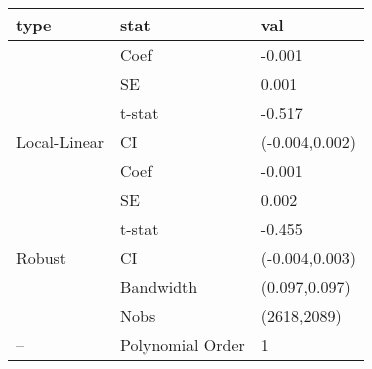 
\begin{tabular}{lll}
\toprule
type & stat & val\\
\midrule
 & Coef & -0.001\\

 & SE & 0.001\\

 & t-stat & -0.517\\

\multirow{-4}{*}{\raggedright\arraybackslash Local-Linear} & CI & (-0.004,0.002)\\
\cmidrule{1-3}
 & Coef & -0.001\\

 & SE & 0.002\\

 & t-stat & -0.455\\

\multirow{-4}{*}{\raggedright\arraybackslash Robust} & CI & (-0.004,0.003)\\
\cmidrule{1-3}
 & Bandwidth & (0.097,0.097)\\

 & Nobs & (2618,2089)\\

\multirow{-3}{*}{\raggedright\arraybackslash --} & Polynomial Order & 1\\
\bottomrule
\end{tabular}